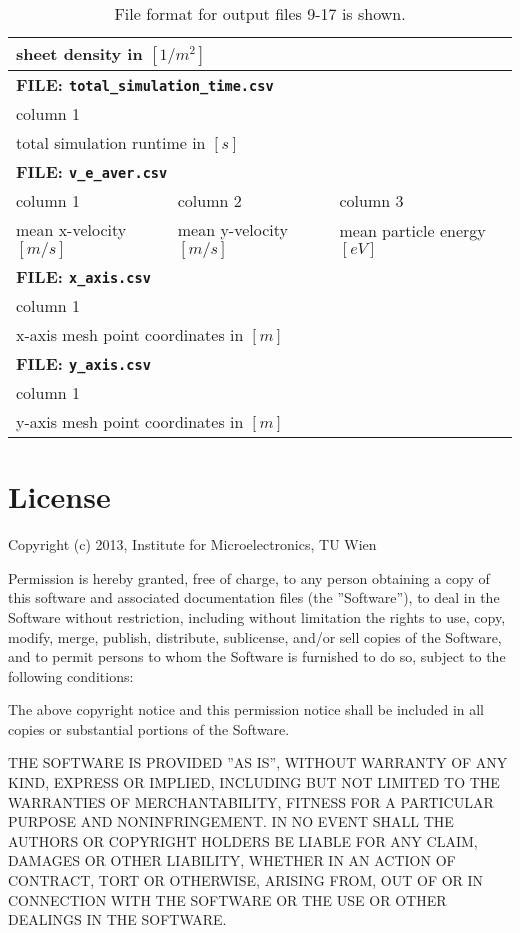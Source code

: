 \begin{table}[ht!]
\begin{tabular}{|m{3.5cm}|m{3.5cm}|m{3.5cm}|m{3.5cm}|m{3.5cm}|}
  \multicolumn{5}{|l|}{sheet density in $[1/m^2]$} \\
\hline \hline
  \multicolumn{5}{|l|}{\textbf{FILE: \texttt{total\_simulation\_time.csv}}} \\
\hline
  \multicolumn{5}{|l|}{column 1}  \\
\hline
  \multicolumn{5}{|l|}{total simulation runtime in $[s]$} \\
\hline \hline
  \multicolumn{5}{|l|}{\textbf{FILE: \texttt{v\_e\_aver.csv}}} \\
\hline
  column 1 & column 2 & \multicolumn{3}{|l|}{column 3}  \\
\hline
  mean x-velocity $[m/s]$ & mean y-velocity $[m/s]$ & \multicolumn{3}{|l|}{mean particle energy $[eV]$} \\
\hline \hline
  \multicolumn{5}{|l|}{\textbf{FILE: \texttt{x\_axis.csv}}} \\
\hline
  \multicolumn{5}{|l|}{column 1}  \\
\hline
  \multicolumn{5}{|l|}{x-axis mesh point coordinates in $[m]$} \\
\hline \hline
  \multicolumn{5}{|l|}{\textbf{FILE: \texttt{y\_axis.csv}}} \\
\hline
  \multicolumn{5}{|l|}{column 1}  \\
\hline
  \multicolumn{5}{|l|}{y-axis mesh point coordinates in $[m]$} \\
\hline
\end{tabular}
\caption{File format for output files 9-17 is shown.}
\label{tab:fileformat2}
\end{table}


\clearpage

\section{License}


Copyright (c) 2013, Institute for Microelectronics, TU Wien

Permission is hereby granted, free of charge, to any person obtaining a copy of this software and associated documentation ﬁles (the ”Software”), to deal in the Software without
restriction, including without limitation the rights to use, copy, modify, merge, publish, distribute, sublicense, and/or sell copies of the Software, and to permit persons to whom the
Software is furnished to do so, subject to the following conditions:

The above copyright notice and this permission notice shall be included in all copies or
substantial portions of the Software.

THE SOFTWARE IS PROVIDED ”AS IS”, WITHOUT WARRANTY OF ANY KIND, EXPRESS OR IMPLIED, INCLUDING BUT NOT LIMITED TO THE WARRANTIES OF
MERCHANTABILITY, FITNESS FOR A PARTICULAR PURPOSE AND NONINFRINGEMENT. IN NO EVENT SHALL THE AUTHORS OR COPYRIGHT HOLDERS BE LIABLE
FOR ANY CLAIM, DAMAGES OR OTHER LIABILITY, WHETHER IN AN ACTION OF
CONTRACT, TORT OR OTHERWISE, ARISING FROM, OUT OF OR IN CONNECTION
WITH THE SOFTWARE OR THE USE OR OTHER DEALINGS IN THE SOFTWARE.
